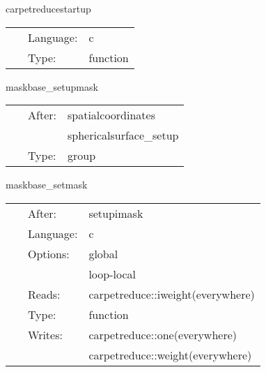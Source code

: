 
\hspace{5mm} carpetreducestartup 

\hspace{5mm}{\it startup routine } 


\hspace{5mm}

 \begin{tabular*}{160mm}{cll} 
~ & Language:  & c \\ 
~ & Type:  & function \\ 
\end{tabular*} 


\vspace{5mm}


\hspace{5mm} maskbase\_setupmask 

\hspace{5mm}{\it set up the weight function } 


\hspace{5mm}

 \begin{tabular*}{160mm}{cll} 
~ & After:  & spatialcoordinates \\ 
~& ~ &sphericalsurface\_setup\\ 
~ & Type:  & group \\ 
\end{tabular*} 


\vspace{5mm}


\hspace{5mm} maskbase\_setmask 

\hspace{5mm}{\it set the weight function } 


\hspace{5mm}

 \begin{tabular*}{160mm}{cll} 
~ & After:  & setupimask \\ 
~ & Language:  & c \\ 
~ & Options:  & global \\ 
~& ~ &loop-local\\ 
~ & Reads:  & carpetreduce::iweight(everywhere) \\ 
~ & Type:  & function \\ 
~ & Writes:  & carpetreduce::one(everywhere) \\ 
~& ~ &carpetreduce::weight(everywhere)\\ 
\end{tabular*} 


